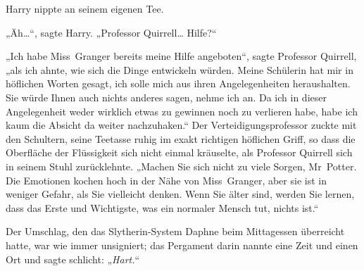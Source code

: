 Harry nippte an seinem eigenen Tee.

„Äh…“, sagte Harry. „Professor Quirrell… Hilfe?“

„Ich habe Miss~Granger bereits meine Hilfe angeboten“, sagte Professor Quirrell, „als ich ahnte, wie sich die Dinge entwickeln würden. Meine Schülerin hat mir in höflichen Worten gesagt, ich solle mich aus ihren Angelegenheiten heraushalten. Sie würde Ihnen auch nichts anderes sagen, nehme ich an. Da ich in dieser Angelegenheit weder wirklich etwas zu gewinnen noch zu verlieren habe, habe ich kaum die Absicht da weiter nachzuhaken.“ Der Verteidigungsprofessor zuckte mit den Schultern, seine Teetasse ruhig im exakt richtigen höflichen Griff, so dass die Oberfläche der Flüssigkeit sich nicht einmal kräuselte, als Professor Quirrell sich in seinem Stuhl zurücklehnte. „Machen Sie sich nicht zu viele Sorgen, Mr~Potter. Die Emotionen kochen hoch in der Nähe von Miss~Granger, aber sie ist in weniger Gefahr, als Sie vielleicht denken. Wenn Sie älter sind, werden Sie lernen, dass das Erste und Wichtigste, was ein normaler Mensch tut, nichts ist.“

\later

Der Umschlag, den das Slytherin-System Daphne beim Mittagessen überreicht hatte, war wie immer unsigniert; das Pergament darin nannte eine Zeit und einen Ort und sagte schlicht: „\emph{Hart.}“

